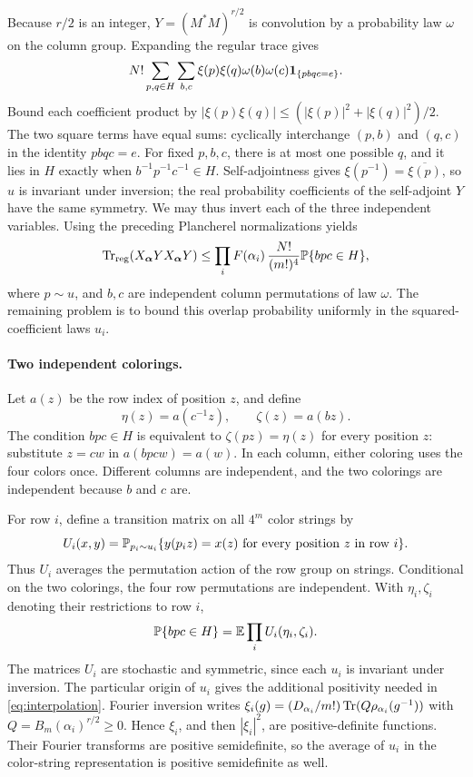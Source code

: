 Because $r/2$ is an integer, $Y=(M^*M)^{r/2}$ is convolution by a
probability law $\omega$ on the column group. Expanding the regular trace gives
\[
 N!\sum_{p,q\in H}\sum_{b,c}\xi(p)\xi(q)\omega(b)\omega(c)
                       \mathbf1_{\{p b q c=e\}}.
\]
Bound each coefficient product by
$|\xi(p)\xi(q)|\le(|\xi(p)|^2+|\xi(q)|^2)/2$.
The two square terms have equal sums: cyclically interchange $(p,b)$
and $(q,c)$ in the identity $pbqc=e$. For fixed $p,b,c$, there is
at most one possible $q$, and it lies in $H$ exactly when
$b^{-1}p^{-1}c^{-1}\in H$.
Self-adjointness gives $\xi(p^{-1})=\overline{\xi(p)}$, so $u$ is
invariant under inversion; the real probability coefficients of the
self-adjoint $Y$ have the same symmetry. We may thus invert each of
the three independent variables. Using the preceding Plancherel
normalizations yields
\begin{equation}\label{eq:coefficient-trace}
 \operatorname{Tr}_{\rm reg}(X_{\boldsymbol\alpha}Y
                         X_{\boldsymbol\alpha}Y)
 \le\prod_i F(\alpha_i)\,
 \frac{N!}{(m!)^4}\mathbb P\{bpc\in H\},
\end{equation}
where $p\sim u$, and $b,c$ are independent column permutations of law
$\omega$. The remaining problem is to bound this overlap probability
uniformly in the squared-coefficient laws $u_i$.

\paragraph{Two independent colorings.}
Let $a(z)$ be the row index of position $z$, and define
\[
 \eta(z)=a(c^{-1}z),\qquad \zeta(z)=a(bz).
\]
The condition $bpc\in H$ is equivalent to
$\zeta(pz)=\eta(z)$ for every position $z$: substitute $z=cw$ in
$a(bpcw)=a(w)$. In each column, either coloring uses the four colors
once. Different columns are independent, and the two colorings are
independent because $b$ and $c$ are.

For row $i$, define a transition matrix on all $4^m$ color strings by
\[
 U_i(x,y)=\mathbb P_{p_i\sim u_i}\{y(p_i z)=x(z)\text{ for every position }z
                         \text{ in row }i\}.
\]
Thus $U_i$ averages the permutation action of the row group on strings.
Conditional on the two colorings, the four row permutations are
independent. With $\eta_i,\zeta_i$ denoting their restrictions to row $i$,
\[
 \mathbb P\{bpc\in H\}=\mathbb E\prod_i U_i(\eta_i,\zeta_i).
\]
The matrices $U_i$ are stochastic and symmetric, since each $u_i$ is
invariant under inversion. The particular origin of $u_i$ gives the
additional positivity needed in \eqref{eq:interpolation}. Fourier
inversion writes
$\xi_i(g)=(D_{\alpha_i}/m!)\operatorname{Tr}(Q\rho_{\alpha_i}(g^{-1}))$ with
$Q=B_m(\alpha_i)^{r/2}\ge0$. Hence $\xi_i$, and then
$|\xi_i|^2$, are positive-definite functions. Their Fourier transforms
are positive semidefinite, so the average of $u_i$ in the color-string
representation is positive semidefinite as well.

